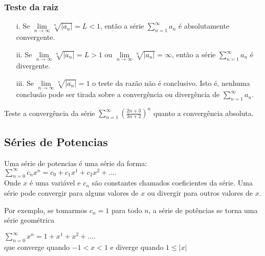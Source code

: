 \subsubsection{Teste da raiz} 
\begin{itemize}
	\item[i.]Se $\lim\limits_{n\rightarrow\infty} \sqrt[n]{\left|a_{n} \right| }=L<1$, então a série $\sum_{n=1}^{\infty}a_{n}$ é absolutamente convergente.
	\item[ii.]Se $\lim\limits_{n\rightarrow\infty} \sqrt[n]{\left|a_{n} \right| }=L>1$ ou $\lim\limits_{n\rightarrow\infty} \sqrt[n]{\left|a_{n} \right| }=\infty$, então a série $\sum_{n=1}^{\infty}a_{n}$ é divergente.
	\item[iii.]Se $\lim\limits_{n\rightarrow\infty} \sqrt[n]{\left|a_{n} \right| }=1$ o teste da razão não é conclusivo. Isto é, nenhuma conclusão pode ser tirada sobre a convergência ou divergência de $\sum_{n=1}^{\infty}a_{n}$. 
\end{itemize}
\begin{ex}
	Teste a convergência da série $\sum_{n=1}^{\infty}(\frac{2n+3}{3n+2})^{n}$ quanto a convergência absoluta. 
\end{ex}

\newpage
\begin{center}
	\section{Séries de Potencias}
\end{center}
Uma série de potencias é uma série da forma:\\

$\sum_{n=0}^{\infty}c_{n}x^{n}=c_{0}+c_{1}x^{1}+c_{2}x^{2}+....$ \\

Onde $x$ é uma variável e $c_{n}$ são constantes chamados coeficientes da série. Uma série pode convergir para alguns valores de $x$ ou divergir para outros valores de $x$.

Por exemplo, se tomarmos $c_{n}=1$ para todo $n$, a série de potências se torna uma série geométrica

$\sum_{n=0}^{\infty}x^{n}=1+x^{1}+x^{2}+....$ \\
que converge quando $-1<x<1$ e diverge quando $1\leq|x|$


